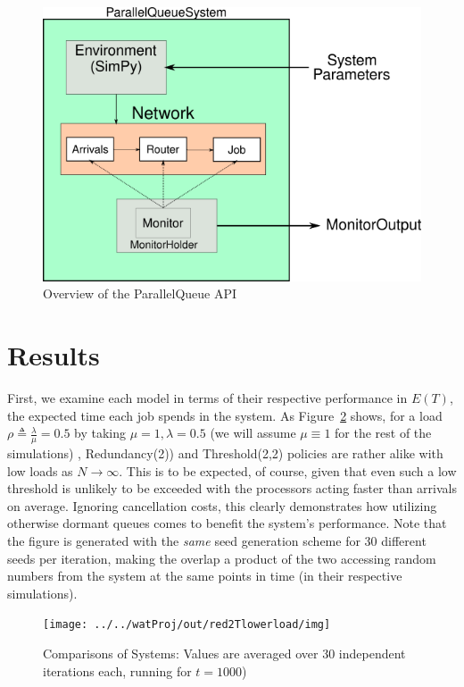 \begin{figure}
    \centering
    \includegraphics[scale=0.7]{pq.png}
    \caption{Overview of the ParallelQueue API}
    \label{fig:API}
\end{figure}


\section{Results}\label{sec:results}
First, we examine each model in terms of their respective performance in $E(T)$, the expected time each job spends in the system.  
As Figure~\ref{fig:img} shows, for a load $\rho \triangleq \frac{\lambda}{\mu} = 0.5$ by taking $\mu=1, \lambda = 0.5$ (we will assume $\mu \equiv 1$ for the
rest of the simulations) , Redundancy(2)) and Threshold(2,2) policies are rather alike with low loads as $N \rightarrow \infty$. This is to be expected, of course, given that even such a low threshold is unlikely to be exceeded with the processors acting faster than arrivals on average. Ignoring cancellation costs, this clearly demonstrates how utilizing otherwise dormant queues comes to benefit the system's performance. Note that the figure is generated with the \textit{same} seed generation scheme for 30 different seeds per iteration, making the overlap a product of  the two accessing random numbers from the system at the same points in time (in their respective simulations).

\begin{figure}
	\centering
	\texttt{[image: ../../watProj/out/red2Tlowerload/img]}
	\caption{Comparisons of Systems: Values are averaged over 30 independent iterations each, running for $t=1000$)}
	\label{fig:img}
\end{figure}

